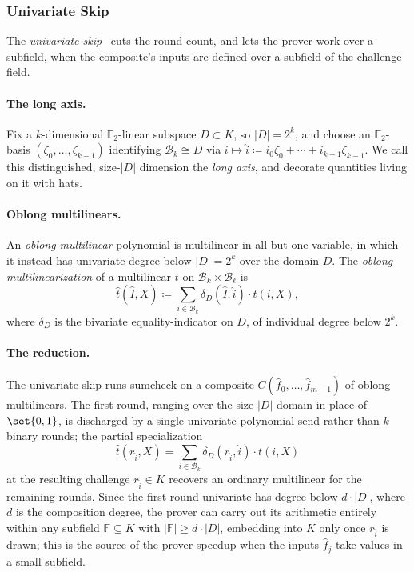 \documentclass{article}
\theoremstyle{definition}
\newcommand{\BB}{\mathcal{B}}
\newcommand{\FF}[1]{\mathbb{F}_{#1}}
\begin{document}
\subsubsection{Univariate Skip}
\label{sec:oblong}
The \emph{univariate skip}~\cite[\S 5]{Gruen:2024aa} cuts the round count, and lets the prover work over a subfield, when the composite's inputs are defined over a subfield of the challenge field.

\paragraph{The long axis.}
Fix a $k$-dimensional $\FF{2}$-linear subspace $D \subset K$, so $|D| = 2^k$, and choose an $\FF{2}$-basis $(\zeta_0, \ldots, \zeta_{k - 1})$ identifying $\BB_k \cong D$ via $i \mapsto \widehat{i} \coloneqq i_0 \zeta_0 + \cdots + i_{k - 1} \zeta_{k - 1}$. We call this distinguished, size-$|D|$ dimension the \emph{long axis}, and decorate quantities living on it with hats.

\paragraph{Oblong multilinears.}
An \emph{oblong-multilinear} polynomial is multilinear in all but one variable, in which it instead has univariate degree below $|D| = 2^k$ over the domain $D$. The \emph{oblong-multilinearization} of a multilinear $t$ on $\BB_k \times \BB_\ell$ is
\[
  \widehat{t}(\widehat{I}, X) \coloneqq \sum_{i \in \BB_k} \delta_D(\widehat{I}, \widehat{i}) \cdot t(i, X),
\]
where $\delta_D$ is the bivariate equality-indicator on $D$, of individual degree below $2^k$.

\paragraph{The reduction.}
The univariate skip runs sumcheck on a composite $C(\widehat{f}_0, \ldots, \widehat{f}_{m - 1})$ of oblong multilinears. The first round, ranging over the size-$|D|$ domain in place of $\set{0, 1}$, is discharged by a single univariate polynomial send rather than $k$ binary rounds; the partial specialization
\[
  \widehat{t}(r_{\widehat{i}}, X) = \sum_{i \in \BB_k} \delta_D(r_{\widehat{i}}, \widehat{i}) \cdot t(i, X)
\]
at the resulting challenge $r_{\widehat{i}} \in K$ recovers an ordinary multilinear for the remaining rounds. Since the first-round univariate has degree below $d \cdot |D|$, where $d$ is the composition degree, the prover can carry out its arithmetic entirely within any subfield $\mathbb{F} \subseteq K$ with $|\mathbb{F}| \geq d \cdot |D|$, embedding into $K$ only once $r_{\widehat{i}}$ is drawn; this is the source of the prover speedup when the inputs $\widehat{f}_j$ take values in a small subfield.
\end{document}
